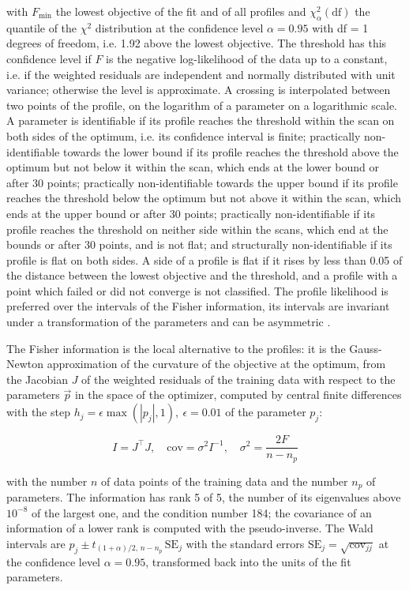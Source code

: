 with $F_{\min}$ the lowest objective of the fit and of all profiles and $\chi^2_{\alpha}(\mathrm{df})$ the quantile of the $\chi^2$ distribution at the confidence level $\alpha = 0.95$ with df = 1 degrees of freedom, i.e. 1.92 above the lowest objective. The threshold has this confidence level if $F$ is the negative log-likelihood of the data up to a constant, i.e. if the weighted residuals are independent and normally distributed with unit variance; otherwise the level is approximate. A crossing is interpolated between two points of the profile, on the logarithm of a parameter on a logarithmic scale. A parameter is identifiable if its profile reaches the threshold within the scan on both sides of the optimum, i.e. its confidence interval is finite; practically non-identifiable towards the lower bound if its profile reaches the threshold above the optimum but not below it within the scan, which ends at the lower bound or after 30 points; practically non-identifiable towards the upper bound if its profile reaches the threshold below the optimum but not above it within the scan, which ends at the upper bound or after 30 points; practically non-identifiable if its profile reaches the threshold on neither side within the scans, which end at the bounds or after 30 points, and is not flat; and structurally non-identifiable if its profile is flat on both sides. A side of a profile is flat if it rises by less than 0.05 of the distance between the lowest objective and the threshold, and a profile with a point which failed or did not converge is not classified. The profile likelihood is preferred over the intervals of the Fisher information, its intervals are invariant under a transformation of the parameters and can be asymmetric \cite{Wieland2021}.

The Fisher information is the local alternative to the profiles: it is the Gauss-Newton approximation of the curvature of the objective at the optimum, from the Jacobian $J$ of the weighted residuals of the training data with respect to the parameters $\vec{p}$ in the space of the optimizer, computed by central finite differences with the step $h_j = \epsilon \max(|p_j|, 1),\ \epsilon = 0.01$ of the parameter $p_j$:

\begin{equation}
I = J^\top J, \quad \mathrm{cov} = \sigma^2 I^{-1}, \quad \sigma^2 = \frac{2 F}{n - n_p}
\end{equation}

with the number $n$ of data points of the training data and the number $n_p$ of parameters. The information has rank 5 of 5, the number of its eigenvalues above $10^{-8}$ of the largest one, and the condition number 184; the covariance of an information of a lower rank is computed with the pseudo-inverse. The Wald intervals are $\hat{p}_j \pm t_{(1+\alpha)/2,\, n-n_p}\, \mathrm{SE}_j$ with the standard errors $\mathrm{SE}_j = \sqrt{\mathrm{cov}_{jj}}$ at the confidence level $\alpha = 0.95$, transformed back into the units of the fit parameters.

